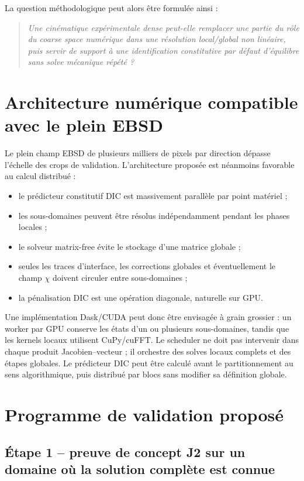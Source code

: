 \documentclass[11pt,a4paper]{article}
\begin{document}
La question méthodologique peut alors être formulée ainsi :
\begin{quote}
\emph{Une cinématique expérimentale dense peut-elle remplacer une partie du rôle du coarse space
numérique dans une résolution local/global non linéaire, puis servir de support à une identification
constitutive par défaut d'équilibre sans solve mécanique répété ?}
\end{quote}

\section{Architecture numérique compatible avec le plein EBSD}

Le plein champ EBSD de plusieurs milliers de pixels par direction dépasse l'échelle des crops de
validation. L'architecture proposée est néanmoins favorable au calcul distribué :
\begin{itemize}
  \item le prédicteur constitutif DIC est massivement parallèle par point matériel ;
  \item les sous-domaines peuvent être résolus indépendamment pendant les phases locales ;
  \item le solveur matrix-free évite le stockage d'une matrice globale ;
  \item seules les traces d'interface, les corrections globales et éventuellement le champ $\chi$ doivent circuler entre sous-domaines ;
  \item la pénalisation DIC est une opération diagonale, naturelle sur GPU.
\end{itemize}

Une implémentation Dask/CUDA peut donc être envisagée à grain grossier : un worker par GPU conserve
les états d'un ou plusieurs sous-domaines, tandis que les kernels locaux utilisent CuPy/cuFFT. Le
scheduler ne doit pas intervenir dans chaque produit Jacobien--vecteur ; il orchestre des solves
locaux complets et des étapes globales. Le prédicteur DIC peut être calculé avant le partitionnement
au sens algorithmique, puis distribué par blocs sans modifier sa définition globale.

\section{Programme de validation proposé}

\subsection{Étape 1 -- preuve de concept J2 sur un domaine où la solution complète est connue}
\end{document}
